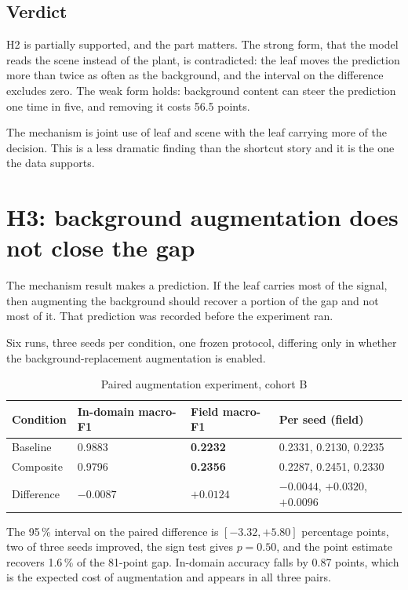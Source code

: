 \subsection{Verdict}

H2 is partially supported, and the part matters. The strong form, that the model
reads the scene instead of the plant, is contradicted: the leaf moves the prediction
more than twice as often as the background, and the interval on the difference
excludes zero. The weak form holds: background content can steer the prediction one
time in five, and removing it costs 56.5 points.

The mechanism is joint use of leaf and scene with the leaf carrying more of the
decision. This is a less dramatic finding than the shortcut story and it is the one
the data supports.

\section{H3: background augmentation does not close the gap}

The mechanism result makes a prediction. If the leaf carries most of the signal, then
augmenting the background should recover a portion of the gap and not most of it.
That prediction was recorded before the experiment ran.

Six runs, three seeds per condition, one frozen protocol, differing only in whether
the background-replacement augmentation is enabled.

\begin{table}[H]
\centering
\caption{Paired augmentation experiment, cohort B}
\label{tab:h3}
\tabfont
\begin{tabularx}{\textwidth}{@{}lYYY@{}}
\toprule
\textbf{Condition} & \textbf{In-domain macro-F1} & \textbf{Field macro-F1} & \textbf{Per seed (field)} \\
\midrule
Baseline & 0.9883 & \textbf{0.2232} & 0.2331, 0.2130, 0.2235 \\
Composite & 0.9796 & \textbf{0.2356} & 0.2287, 0.2451, 0.2330 \\
\midrule
Difference & $-0.0087$ & $+0.0124$ & $-0.0044$, $+0.0320$, $+0.0096$ \\
\bottomrule
\end{tabularx}
\end{table}

The 95\,\% interval on the paired difference is $[-3.32, +5.80]$ percentage points,
two of three seeds improved, the sign test gives $p = 0.50$, and the point estimate
recovers 1.6\,\% of the 81-point gap. In-domain accuracy falls by 0.87 points, which
is the expected cost of augmentation and appears in all three pairs.

